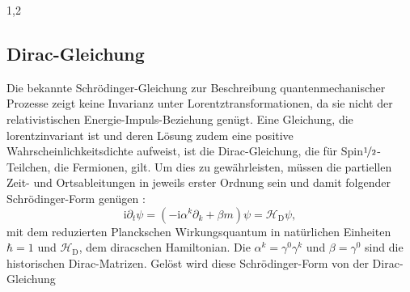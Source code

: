 \documentclass[11pt,a4paper,twoside]{report}
\begin{document}
\begin{spacing}{1,2}
\subsection{Dirac-Gleichung}
Die bekannte Schrödinger-Gleichung zur Beschreibung quantenmechanischer Prozesse zeigt keine Invarianz unter Lorentztransformationen, da sie nicht der 
relativistischen Energie-Impuls-Beziehung genügt. Eine Gleichung, die lorentzinvariant ist und deren Lösung zudem eine positive Wahrscheinlichkeitsdichte 
aufweist, ist
die Dirac-Gleichung, die für Spin$\nicefrac12$-Teilchen, die Fermionen, gilt. Um dies zu gewährleisten, müssen die partiellen Zeit- und Ortsableitungen in 
jeweils erster Ordnung sein und damit folgender Schrödinger-Form genügen \cite{RelQuantMech}:
% 
\begin{equation}
 \text{i} \partial_t \psi = \left(-\text{i}\alpha^k\partial_k + \beta m\right)\psi = \mathcal{H}_\text{D} \psi,
 \label{eq_diracSchroedinger}
\end{equation}
mit dem reduzierten Planckschen Wirkungsquantum in natürlichen Einheiten $\hbar = 1$ und $\mathcal{H}_\text{D}$, dem diracschen Hamiltonian. Die 
$\alpha^k = \gamma^0\gamma^k$ und $\beta = \gamma^0$ sind die historischen Dirac-Matrizen. Gelöst wird
diese Schrödinger-Form von der Dirac-Gleichung
\begin{equation}

\end{equation}
\end{spacing}
\end{document}

